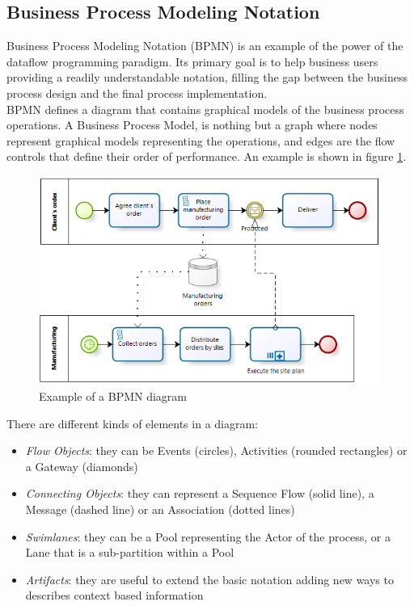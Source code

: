 \subsection{Business Process Modeling Notation}

Business Process Modeling Notation (BPMN) is an example of the power of the dataflow programming paradigm. Its primary goal is to help business users providing a readily understandable notation, filling the gap between the business process design and the final process implementation.
\\

BPMN defines a diagram that contains graphical models of the business process operations. A Business Process Model, is nothing but a graph where nodes represent graphical models representing the operations, and edges are the flow controls that define their order of performance. An example is shown in figure \ref{fig:bpmn}.
\\

 \begin{figure}[htbp]
   \centering
   \includegraphics[width=\linewidth]{pictures/bpmn.png}
   \caption{Example of a BPMN diagram}
   \label{fig:bpmn}
 \end{figure}

There are different kinds of elements in a diagram:

\begin{itemize}
\item{\textit{Flow Objects}: they can be Events (circles), Activities (rounded rectangles) or a Gateway (diamonds)}
\item{\textit{Connecting Objects}: they can represent a Sequence Flow (solid line), a Message (dashed line) or an Association (dotted lines)}
\item{\textit{Swimlanes}: they can be a Pool representing the Actor of the process, or a Lane that is a sub-partition within a Pool}
\item{\textit{Artifacts}: they are useful to extend the basic notation adding new ways to describes context based information}
\end{itemize}

